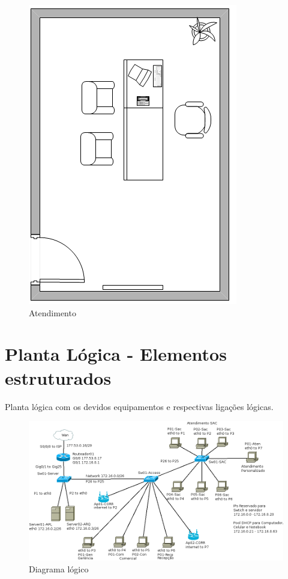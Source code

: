\documentclass[	DIV=calc,%
							paper=a4,%
							fontsize=12pt,%
							onecolumn]{scrartcl}	 					%
\begin{document}
\begin{figure}
	\centering
	\includegraphics[height=\textwidth,angle=90]{atendimento}
	\caption{Atendimento}
	\label{atendimento}
\end{figure}

\section{Planta Lógica - Elementos estruturados}
Planta lógica com os devidos equipamentos e respectivas ligações lógicas.
\begin{figure}
	\centering
	\includegraphics[height=\textwidth]{diagrama-logico}
	\caption{Diagrama lógico}
	\label{diagrama-logico}
\end{figure}
\end{document}
